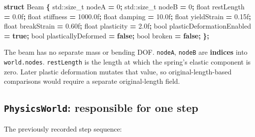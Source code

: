 \documentclass[
  10pt,
  a4paper,
]{article}
\newenvironment{Shaded}{\begin{snugshade}}{\end{snugshade}}
\newcommand{\BuiltInTok}[1]{#1}
\newcommand{\DataTypeTok}[1]{\textcolor[rgb]{0.13,0.29,0.53}{#1}}
\newcommand{\DecValTok}[1]{\textcolor[rgb]{0.00,0.00,0.81}{#1}}
\newcommand{\FloatTok}[1]{\textcolor[rgb]{0.00,0.00,0.81}{#1}}
\newcommand{\KeywordTok}[1]{\textcolor[rgb]{0.13,0.29,0.53}{\textbf{#1}}}
\newcommand{\NormalTok}[1]{#1}
\newcommand{\OperatorTok}[1]{\textcolor[rgb]{0.81,0.36,0.00}{\textbf{#1}}}
\begin{document}
\begin{Shaded}
\begin{Highlighting}[]
\KeywordTok{struct}\NormalTok{ Beam }\OperatorTok{\{}
    \BuiltInTok{std::}\NormalTok{size\_t nodeA }\OperatorTok{=} \DecValTok{0}\OperatorTok{;}
    \BuiltInTok{std::}\NormalTok{size\_t nodeB }\OperatorTok{=} \DecValTok{0}\OperatorTok{;}
    \DataTypeTok{float}\NormalTok{ restLength }\OperatorTok{=} \FloatTok{0.0}\BuiltInTok{f}\OperatorTok{;}
    \DataTypeTok{float}\NormalTok{ stiffness }\OperatorTok{=} \FloatTok{1000.0}\BuiltInTok{f}\OperatorTok{;}
    \DataTypeTok{float}\NormalTok{ damping }\OperatorTok{=} \FloatTok{10.0}\BuiltInTok{f}\OperatorTok{;}
    \DataTypeTok{float}\NormalTok{ yieldStrain }\OperatorTok{=} \FloatTok{0.15}\BuiltInTok{f}\OperatorTok{;}
    \DataTypeTok{float}\NormalTok{ breakStrain }\OperatorTok{=} \FloatTok{0.60}\BuiltInTok{f}\OperatorTok{;}
    \DataTypeTok{float}\NormalTok{ plasticity }\OperatorTok{=} \FloatTok{2.0}\BuiltInTok{f}\OperatorTok{;}
    \DataTypeTok{bool}\NormalTok{ plasticDeformationEnabled }\OperatorTok{=} \KeywordTok{true}\OperatorTok{;}
    \DataTypeTok{bool}\NormalTok{ plasticallyDeformed }\OperatorTok{=} \KeywordTok{false}\OperatorTok{;}
    \DataTypeTok{bool}\NormalTok{ broken }\OperatorTok{=} \KeywordTok{false}\OperatorTok{;}
\OperatorTok{\};}
\end{Highlighting}
\end{Shaded}

The beam has no separate mass or bending DOF. \texttt{nodeA},
\texttt{nodeB} are \textbf{indices} into \texttt{world.nodes}.
\texttt{restLength} is the length at which the spring's elastic
component is zero. Later plastic deformation mutates that value, so
original-length-based comparisons would require a separate
original-length field.

\subsection{\texorpdfstring{\texttt{PhysicsWorld}: responsible for one
step}{PhysicsWorld: responsible for one step}}\label{physicsworld-responsible-for-one-step}

The previously recorded step sequence:
\end{document}
